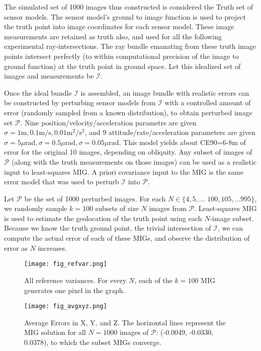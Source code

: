 \documentclass[10pt]{amsart}
\newcommand{\Iimg}{\mathcal{I}}
\newcommand{\Pimg}{\mathcal{P}}
\begin{document}
The simulated set of 1000 images thus constructed is considered the Truth set of
sensor models. The sensor model's ground to image function is used to project
the truth point into image coordinates for each sensor model. These image
measurements are retained as truth also, and used for all the following
experimental ray-intersections. The ray bundle emanating from these truth image
points intersect perfectly (to within computational precision of the image to
ground function) at the truth point in ground space. Let this idealized set of
images and measurements be $\Iimg$.

Once the ideal bundle $\Iimg$ is assembled, an image bundle with realistic
errors can be constructed by perturbing sensor models from $\Iimg$ with a
controlled amount of error (randomly sampled from a known distribution), to
obtain perturbed image set $\Pimg$. Nine position/velocity/ac\-cel\-eration
parametrs are given $\sigma = 1{\mathrm m}, 0.1{\mathrm m}/{\mathrm s},
0.01{\mathrm m}^2/{\mathrm s}^2$, and 9 attitude/rate/acceleration parameters
are given
$\sigma=5\mu\mathrm{rad}, \sigma=0.5\mu\mathrm{rad}, \sigma=0.05\mu\mathrm{rad}$.
This model yields about CE90=6-8m of error for the original 10 images, depending
on obliquity. Any subset of images of $\Pimg$ (along with the truth measurements
on those images) can be used as a realistic input to least-squares MIG. A priori
covariance input to the MIG is the same error model that was used to perturb
$\Iimg$ into $\Pimg$.

Let $\Pimg$ be the set of 1000 perturbed images. For each
$N\in\{4,5,...$ $100,105,...995\}$, we randomly sample $k=100$ subsets of size
$N$ images from $\Pimg$. Least-squares MIG is used to estimate the geolocation
of the truth point using each $N$-image subset. Because we know the truth ground
point, the trivial intersection of $\Iimg$, we can compute the actual error of
each of these MIGs, and observe the distribution of error as $N$ increases.

\begin{figure}
\texttt{[image: fig\_refvar.png]}
\caption{\label{fig:vanillaref}All reference variances. For every $N$, each of
  the $k=100$ MIG generates one pixel in the graph.}
\end{figure}

\begin{figure}
\texttt{[image: fig\_avgxyz.png]}
\caption{\label{fig:vanillaxyz}Average Errors in X, Y, and Z. The horizontal
  lines represent the MIG solution for all $N=1000$ images of $\Pimg$: (-0.0049,
  -0.0330, 0.0378), to which the subset MIGs converge.}
\end{figure}
\end{document}
